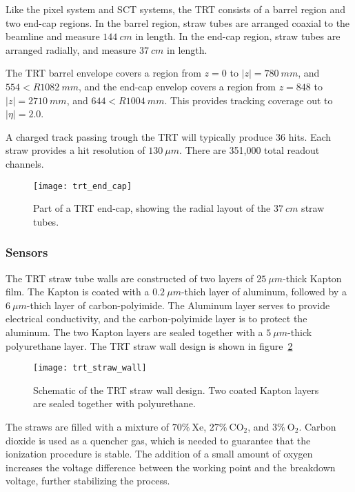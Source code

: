 Like the pixel system and SCT systems, the TRT consists of a barrel region and two end-cap regions.
In the barrel region, straw tubes are arranged coaxial to the beamline and measure $144~cm$ in length.
In the end-cap region, straw tubes are arranged radially, and measure $37~cm$ in length.\cite{atlas-detector-2008}

The TRT barrel envelope covers a region from $z = 0$ to $|z|  = 780~mm$, and $554 < R 1082~mm$,
and the end-cap envelop covers a region from $z = 848$ to $|z|  = 2710~mm$, and $644 < R 1004~mm$.
This provides tracking coverage out to $|\eta| = 2.0$.\cite{atlas-detector-2008}

A charged track passing trough the TRT will typically produce 36 hits.
Each straw provides a hit resolution of $130~\mu m$.
There are 351,000 total readout channels.

\begin{figure}[h]
\texttt{[image: trt\_end\_cap]}
\caption{Part of a TRT end-cap, showing the radial layout of the $37~cm$ straw tubes.}
\label{fig:trt_end_cap}\cite{trt-2013}
\end{figure}

\subsubsection{Sensors}

The TRT straw tube walls are constructed of two layers of $25~\mu m$-thick Kapton film.
The Kapton is coated with a $0.2~\mu m$-thich layer of aluminum, followed by a $6~\mu m$-thich layer of carbon-polyimide.
The Aluminum layer serves to provide electrical conductivity, and the carbon-polyimide layer is to protect the aluminum.
The two Kapton layers are sealed together with a $5~\mu m$-thick polyurethane layer.\cite{trt-2013}
The TRT straw wall design is shown in figure~\ref{fig:trt_straw_wall}

\begin{figure}[h]
\texttt{[image: trt\_straw\_wall]}
\caption{Schematic of the TRT straw wall design. Two coated Kapton layers are sealed together with polyurethane.}
\label{fig:trt_straw_wall}\cite{trt-2013}
\end{figure}

The straws are filled with a mixture of $70\%~\mathrm{Xe}$, $27\%~\mathrm{CO_2}$,
and $3\%~\mathrm{O_2}$.
Carbon dioxide is used as a quencher gas, which is needed to guarantee that the ionization procedure is stable.
The addition of a small amount of oxygen increases the voltage difference between the working point and the breakdown voltage,
further stabilizing the process.\cite{trt-2013}

